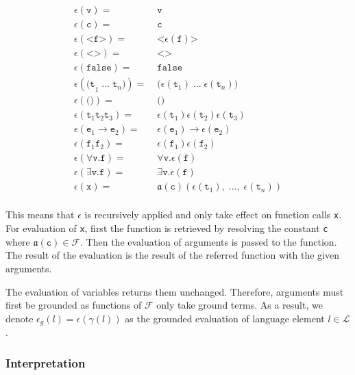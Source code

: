 \documentclass[runningheads]{llncs}
\begin{document}
\begin{align*}
  \epsilon(\texttt{v}) =\; & \texttt{v} \\
  \epsilon(\texttt{c}) =\; & \texttt{c} \\
  \epsilon(\texttt{<f>}) =\; & \texttt{<} \epsilon(\texttt{f}) \texttt{>} \\
  \epsilon(\texttt{<>}) =\; & \texttt{<>} \\
  \epsilon(\texttt{false}) =\; & \texttt{false} \\
  \epsilon(\texttt{(t}_1 \;\dots\; \texttt{t}_n \texttt{)} ) =\; & \texttt{(}\epsilon(\texttt{t}_1) \;\dots\; \epsilon(\texttt{t}_n) \texttt{)} \\
  \epsilon(\texttt{()}) =\; & \texttt{()} \\
  \epsilon(\texttt{t}_1\texttt{t}_2\texttt{t}_3) =\; & \epsilon(\texttt{t}_1) \epsilon(\texttt{t}_2) \epsilon(\texttt{t}_3) \\
  \epsilon(\texttt{e}_1 \rightarrow \texttt{e}_2) =\; & \epsilon(\texttt{e}_1) \rightarrow \epsilon(\texttt{e}_2) \\
  \epsilon(\texttt{f}_1 \texttt{f}_2) =\; & \epsilon(\texttt{f}_1) \epsilon(\texttt{f}_2) \\
  \epsilon(\forall\texttt{v.f}) =\; & \forall\texttt{v.}\epsilon(\texttt{f}) \\
  \epsilon(\exists\texttt{v.f}) =\; & \exists\texttt{v.}\epsilon(\texttt{f}) \\
  \epsilon(\texttt{x}) =\; & \mathfrak{a}(\texttt{c})(\epsilon(\texttt{t}_1), \;\dots,\; \epsilon(\texttt{t}_n)) \\
\end{align*}

\noindent This means that $\epsilon$ is recursively applied and only take effect on function calls \texttt{x}.
For evaluation of \texttt{x}, first the function is retrieved by resolving the constant \texttt{c} where $\mathfrak{a}(\texttt{c}) \in \mathcal{F}$.
Then the evaluation of arguments is passed to the function.
The result of the evaluation is the result of the referred function with the given arguments.

The evaluation of variables returns them unchanged.
Therefore, arguments must first be grounded as functions of $\mathcal{F}$ only take ground terms.
As a result, we denote $\epsilon_g(l) = \epsilon(\gamma(l))$ as the grounded evaluation of language element $l \in \mathcal{L}$.



\subsubsection{Interpretation}
\label{sec:n3x-semantics-interpret}
\end{document}
